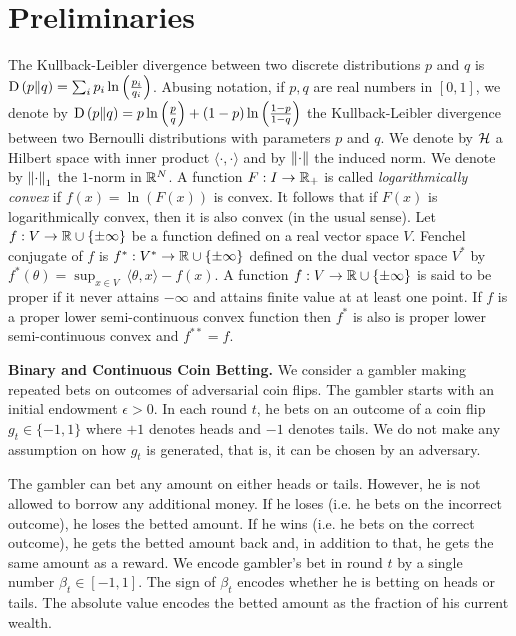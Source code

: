 \section{Preliminaries}

The Kullback-Leibler divergence between two discrete distributions $p$ and $q$
is $\operatorname*{D}\left({p}\middle\|{q}\right) = \sum_{i} p_i \ln\left( \tfrac{p_i}{q_i} \right)$. Abusing
notation, if $p,q$ are real numbers in $[0,1]$, we denote by $\operatorname*{D}\left({p}\middle\|{q}\right) = p \ln
\left(\tfrac{p}{q} \right) + (1-p) \ln \left(\tfrac{1-p}{1-q} \right)$ the
Kullback-Leibler divergence between two Bernoulli distributions with parameters
$p$ and $q$.  We denote by $\mathcal{H}$ a Hilbert space with inner product $\langle
\cdot, \cdot\rangle$ and by $\left\|{\cdot}\right\|$ the induced norm.  We denote by
$\left\|{\cdot}\right\|_1$ the $1$-norm in $\mathbb{R}^N$.  A function $F:I \to \mathbb{R}_+$ is called
\emph{logarithmically convex} if $f(x) = \ln(F(x))$ is convex. It follows that
if $F(x)$ is logarithmically convex, then it is also convex (in the usual
sense).  Let $f:V \to \mathbb{R} \cup \{\pm\infty\}$ be a function defined on a real
vector space $V$. Fenchel conjugate of $f$ is $f^*:V^* \to \mathbb{R} \cup \{\pm
\infty\}$ defined on the dual vector space $V^*$ by $f^*(\theta) = \sup_{x \in
V} \ \langle \theta, x \rangle - f(x)$.  A function $f:V \to \mathbb{R} \cup \{\pm
\infty\}$ is said to be proper if it never attains $-\infty$ and attains finite
value at at least one point. If $f$ is a proper lower semi-continuous convex
function then $f^*$ is also is proper lower semi-continuous convex and
$f^{**}=f$.

\textbf{Binary and Continuous Coin Betting.} We consider a gambler making
repeated bets on outcomes of adversarial coin flips. The gambler starts with an
initial endowment $\epsilon > 0$. In each round $t$, he bets on an outcome of a
coin flip $g_t \in \{-1,1\}$ where $+1$ denotes heads and $-1$ denotes tails.
We do not make any assumption on how $g_t$ is generated, that is, it can be
chosen by an adversary.

The gambler can bet any amount on either heads or tails. However, he is not
allowed to borrow any additional money. If he loses (i.e. he bets on the
incorrect outcome), he loses the betted amount. If he wins (i.e. he bets on the
correct outcome), he gets the betted amount back and, in addition to that, he
gets the same amount as a reward.  We encode gambler's bet in round $t$ by a
single number $\beta_t \in [-1,1]$. The sign of $\beta_t$ encodes whether he is
betting on heads or tails. The absolute value encodes the betted amount as the
fraction of his current wealth.

